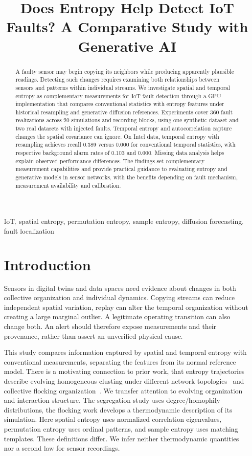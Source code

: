 \documentclass[conference]{IEEEtran}
\title{Does Entropy Help Detect IoT Faults? A Comparative Study with Generative AI}
\author{
\IEEEauthorblockN{Alexander V. Mantzaris}
\IEEEauthorblockA{
\textit{School of Data, Mathematical,}\\
\textit{and Statistical Sciences}\\
\textit{University of Central Florida}\\
Orlando, FL, USA\\
Alexander.Mantzaris@ucf.edu
}
\and
\IEEEauthorblockN{James H. Korris}
\IEEEauthorblockA{
\textit{Creative Technologies Inc.}\\
Hollywood, CA, USA\\
james.korris@cretecinc.com
}
}
\begin{document}
\maketitle
\begin{abstract}
A faulty sensor may begin copying its neighbors while producing apparently plausible readings. Detecting such changes requires examining both relationships between sensors and patterns within individual streams. We investigate spatial and temporal entropy as complementary measurements for IoT fault detection through a GPU implementation that compares conventional statistics with entropy features under historical resampling and generative diffusion references. Experiments cover 360 fault realizations across 20 simulations and recording blocks, using one synthetic dataset and two real datasets with injected faults. Temporal entropy and autocorrelation capture changes the spatial covariance can ignore. On Intel data, temporal entropy with resampling achieves recall 0.389 versus 0.000 for conventional temporal statistics, with respective background alarm rates of 0.103 and 0.000. Missing data analysis helps explain observed performance differences. The findings set complementary measurement capabilities and provide practical guidance to evaluating entropy and generative models in sensor networks, with the benefits depending on fault mechanism, measurement availability and calibration.
\end{abstract}
\begin{IEEEkeywords}
IoT, spatial entropy, permutation entropy, sample entropy, diffusion forecasting, fault localization
\end{IEEEkeywords}

\section{Introduction}
Sensors in digital twins and data spaces need evidence about changes in both
collective organization and individual dynamics. Copying streams can reduce
independent spatial variation, replay can alter the temporal organization without
creating a large marginal outlier. A legitimate operating transition can also
change both. An alert should therefore expose measurements and their provenance,
rather than assert an unverified physical cause.

This study compares information captured by spatial and temporal entropy with
conventional measurements, separating the features from its normal reference
model. There is a motivating connection to prior work, that entropy
trajectories describe evolving homogeneous clusting under different network
topologies~\cite{mantzaris2024} and collective flocking
organization~\cite{mantzaris2025}. We transfer attention to evolving organization
and interaction structure. The segregation study uses degree/homophily
distributions, the flocking work develops a thermodynamic description of its
simulation. Here spatial entropy uses normalized correlation eigenvalues,
permutation entropy uses ordinal patterns, and sample entropy uses matching
templates. These definitions differ. We infer neither thermodynamic quantities
nor a second law for sensor recordings.
\end{document}
